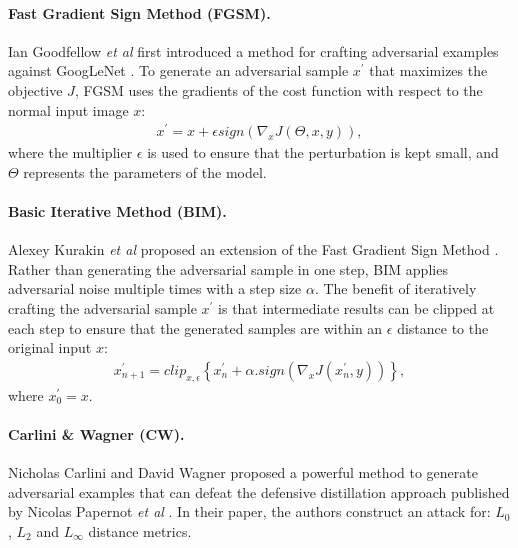 \paragraph{Fast Gradient Sign Method (FGSM).}
Ian Goodfellow \emph{et al} first introduced a method for crafting adversarial examples
\cite{goodfellow_explaining_2015} against GoogLeNet \cite{szegedy_going_2014}.
To generate an adversarial sample $x^{\prime}$ that maximizes the objective $J$,
FGSM uses the gradients of the cost function with respect to the normal input
image $x$:
\begin{align} \label{eq:fgsm} x^{\prime}=x+\epsilon
    sign\left(\nabla_{x}J\left(\Theta,x,y\right)\right),\end{align} where the
multiplier $\epsilon$ is used to ensure that the perturbation is kept small, and
$\Theta$ represents the parameters of the model.

\paragraph{Basic Iterative Method (BIM).}
Alexey Kurakin \emph{et al} proposed an extension of the Fast Gradient Sign Method
\cite{kurakin_adversarial_2017}. Rather than generating the adversarial sample
in one step, BIM applies adversarial noise multiple times with a step size
$\alpha$. The benefit of iteratively crafting the adversarial sample
$x^{\prime}$ is that intermediate results can be clipped at each step to ensure
that the generated samples are within an $\epsilon$ distance to the original
input $x$:
\begin{align} \label{eq:bim}
    x^{\prime}_{n+1}=clip_{x,\epsilon}
    \left\{ x^{\prime}_{n}+\alpha.sign\left(\nabla_{x}J\left(x^{\prime}_{n},y\right)\right)\right\},
\end{align}
where $x^{\prime}_{0}=x$.

\paragraph{Carlini \& Wagner (CW).}
Nicholas Carlini and David Wagner proposed a powerful method to generate
adversarial examples \cite{carlini_towards_2017} that can defeat the defensive
distillation approach published by Nicolas Papernot \emph{et al}
\cite{papernot_distillation_2016}. In their paper, the authors construct an
attack for: $L_{0}$, $L_{2}$ and $L_{\infty}$ distance metrics.


